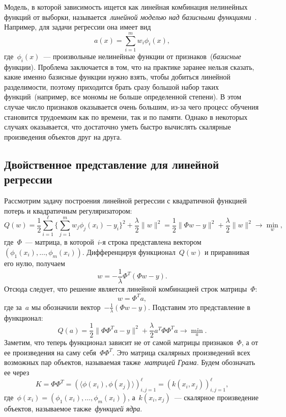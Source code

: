 \documentclass[12pt,fleqn]{article}
\begin{document}
Модель, в которой зависимость ищется как линейная комбинация
нелинейных функций от выборки, называется~\emph{линейной моделью над
базисными функциями}~\cite{bishop06prml}.
Например, для задачи регрессии она имеет вид
\[
    a(x) = \sum_{i = 1}^{m} w_i \phi_i(x),
\]
где~$\phi_i(x)$~--- произвольные нелинейные функции от
признаков~(\emph{базисные} функции).
Проблема заключается в том, что на практике
заранее нельзя сказать, какие именно базисные функции
нужно взять, чтобы добиться линейной разделимости, поэтому приходится
брать сразу большой набор таких функций~(например, все мономы не больше определенной
степени).
В этом случае число признаков оказывается очень большим,
из-за чего процесс обучения становится трудоемким как по времени, так и по памяти.
Однако в некоторых случаях оказывается, что достаточно уметь быстро
вычислять скалярные произведения объектов друг на друга.

\subsection{Двойственное представление для линейной регрессии}
Рассмотрим задачу построения линейной регрессии с квадратичной
функцией потерь и квадратичным регуляризатором:
\[
    Q(w)
    =
    \frac{1}{2} \sum_{i = 1}^{\ell} \Biggl\{
        \sum_{j = 1}^{m} w_j \phi_j(x_{i}) - y_i
    \Biggr\}^2
    +
    \frac{\lambda}{2} \|w\|^2
    =
    \frac{1}{2} \| \Phi w - y \|^2 + \frac{\lambda}{2} \|w\|^2 \to \min_w,
\]
где~$\Phi$~--- матрица, в которой~$i$-я строка представлена
вектором~$(\phi_1(x_i), \dots, \phi_m(x_i))$.
Дифференцируя функционал~$Q(w)$ и приравнивая его нулю,
получаем
\[
    w = - \frac{1}{\lambda}
        \Phi^T (\Phi w - y).
\]
Отсюда следует, что решение является линейной комбинацией
строк матрицы~$\Phi$:
\[
    w = \Phi^T a,
\]
где за~$a$ мы обозначили вектор~$-\frac{1}{\lambda} (\Phi w - y)$.
Подставим это представление в функционал:
\[
    Q(a)
    =
    \frac{1}{2} \| \Phi \Phi^T a - y \|^2 + \frac{\lambda}{2} a^T \Phi \Phi^T a \to \min_a.
\]
Заметим, что теперь функционал зависит не от самой матрицы признаков~$\Phi$,
а от ее произведения на саму себя~$\Phi \Phi^T$.
Это матрица скалярных произведений всех возможных пар объектов,
называемая также~\emph{матрицей Грама}.
Будем обозначать ее через
\[
    K = \Phi \Phi^T =
    (\langle \phi(x_i), \phi(x_j) \rangle)_{i, j = 1}^{\ell}
    =
    (k(x_i, x_j))_{i, j = 1}^{\ell},
\]
где~$\phi(x_i) = (\phi_1(x_i), \dots, \phi_m(x_i))$,
а~$k(x_i, x_j)$~--- скалярное произведение объектов,
называемое также~\emph{функцией ядра}.
\end{document}
